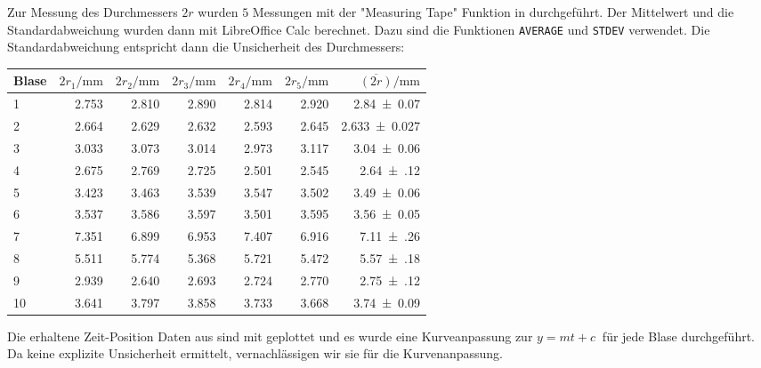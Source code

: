 		Zur Messung des Durchmessers $2r$ wurden $5$ Messungen mit der "Measuring Tape" Funktion in \tracker{} durchgeführt. Der Mittelwert und die Standardabweichung wurden dann mit LibreOffice Calc berechnet. Dazu sind die Funktionen \texttt{AVERAGE} und \texttt{STDEV} verwendet. Die Standardabweichung entspricht dann die Unsicherheit des Durchmessers:
		\begin{center}
			\begin{tabular}{l*{6}{r}}
				\toprule
				Blase & $2r_1/\si{\milli\meter}$ & $2r_2/\si{\milli\meter}$ & $2r_3/\si{\milli\meter}$ & $2r_4/\si{\milli\meter}$ & $2r_5/\si{\milli\meter}$ & $\overline{(2r)}/\si{\milli\meter}$ \\
				\midrule
				\num{1} & \num{2.753} & \num{2.810} & \num{2.890} & \num{2.814} & \num{2.920}  & \num{2.84(7)} \\
				\num{2} & \num{2.664} & \num{2.629} & \num{2.632} & \num{2.593} & \num{2.645}  & \num{2.633(27)} \\
				\num{3} & \num{3.033} & \num{3.073} & \num{3.014} & \num{2.973} & \num{3.117}  & \num{3.04(6)} \\
				\num{4} & \num{2.675} & \num{2.769} & \num{2.725} & \num{2.501} & \num{2.545}  & \num{2.64(12)} \\
				\num{5} & \num{3.423} & \num{3.463} & \num{3.539} & \num{3.547} & \num{3.502}  & \num{3.49(6)} \\
				\num{6} & \num{3.537} & \num{3.586} & \num{3.597} & \num{3.501} & \num{3.595}  & \num{3.56(5)} \\
				\num{7} & \num{7.351} & \num{6.899} & \num{6.953} & \num{7.407} & \num{6.916}  & \num{7.11(26)} \\
				\num{8} & \num{5.511} & \num{5.774} & \num{5.368} & \num{5.721} & \num{5.472}  & \num{5.57(18)} \\
				\num{9} & \num{2.939} & \num{2.640} & \num{2.693} & \num{2.724} & \num{2.770}  & \num{2.75(12)} \\
				\num{10} & \num{3.641} & \num{3.797} & \num{3.858} & \num{3.733} & \num{3.668} & \num{3.74(9)} \\
				\bottomrule
			\end{tabular}
		\end{center}

		Die erhaltene Zeit-Position Daten aus \tracker{} sind mit \gnuplot{} geplottet und es wurde eine Kurveanpassung zur $y = mt + c~$ für jede Blase durchgeführt. Da \tracker{} keine explizite Unsicherheit ermittelt, vernachlässigen wir sie für die Kurvenanpassung.

